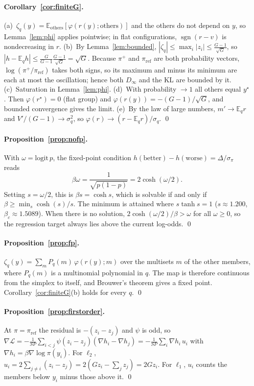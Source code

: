 \documentclass[11pt]{article}
\theoremstyle{definition}
\theoremstyle{remark}
\newcommand{\E}{\mathbb{E}}
\newcommand{\pref}{\pi_{\mathrm{ref}}}
\newcommand{\sgn}{\operatorname{sgn}}
\newcommand{\Dinf}{D_{\infty}}
\newcommand{\cL}{\mathcal{L}}
\newcommand{\1}{\mathbb{1}}
\begin{document}
\paragraph{Corollary~\ref{cor:finiteG}.} (a)~$\zeta_q(y)=\E_{\mathrm{others}}[\varphi(r(y);\mathrm{others})]$
and the others do not depend on $y$, so Lemma~\ref{lem:phi} applies pointwise; in
flat configurations, $\sgn(r-v)$ is nondecreasing in $r$. (b)~By
Lemma~\ref{lem:bounded}, $|\zeta_q|\le\max_i|z_i|\le\frac{G-1}{\sqrt G}$, so
$|h-\E_qh|\le\frac{G}{G-1}\frac{G-1}{\sqrt G}=\sqrt G$. Because
$\pi^+$ and $\pref$ are both probability vectors, $\log(\pi^+/\pref)$ takes both signs, so
its maximum and minus its minimum are each at most the oscillation; hence both
$\Dinf$ and the KL are bounded by it. (c)~Saturation in Lemma~\ref{lem:phi}.
(d)~With probability $\to1$ all others equal $y^\star$. Then $\varphi(r^\star)=0$ (flat group)
and $\varphi(r(y))=-(G-1)/\sqrt G$, and bounded convergence gives the limit.
(e)~By the law of large numbers, $m'\to\E_qr$ and $V'/(G-1)\to\sigma_q^2$, so
$\varphi(r)\to(r-\E_qr)/\sigma_q$. \qed

\paragraph{Proposition~\ref{prop:nofp}.} With $\omega=\mathrm{logit}\,p$, the fixed-point
condition $h(\text{better})-h(\text{worse})=\Delta/\sigma_\pi$ reads
\[
  \beta\omega=\frac{1}{\sqrt{p(1-p)}}=2\cosh(\omega/2).
\]
Setting $s=\omega/2$, this is $\beta s=\cosh s$, which is solvable if and only if
$\beta\ge\min_s\cosh(s)/s$. The minimum is attained where $s\tanh s=1$
($s\approx1.200$, $\beta_c\approx1.5089$). When there is no solution,
$2\cosh(\omega/2)/\beta>\omega$ for all $\omega\ge0$, so the regression target always lies
above the current log-odds. \qed

\paragraph{Proposition~\ref{prop:fp}.} $\zeta_q(y)=\sum_mP_q(m)\,\varphi(r(y);m)$ over the
multisets $m$ of the other members, where $P_q(m)$ is a multinomial polynomial in
$q$. The map is therefore continuous from the simplex to itself, and Brouwer's
theorem gives a fixed point. Corollary~\ref{cor:finiteG}(b) holds for every $q$. \qed

\paragraph{Proposition~\ref{prop:firstorder}.} At $\pi=\pref$ the residual is
$-(z_i-z_j)$ and $\psi$ is odd, so
$\nabla\cL=-\frac{1}{SP}\sum_{i<j}\psi(z_i-z_j)(\nabla h_i-\nabla h_j)=-\frac{1}{SP}\sum_i\nabla h_i\,u_i$
with $\nabla h_i=\beta\nabla\log\pi(y_i)$. For $\ell_2$,
$u_i=2\sum_{j\neq i}(z_i-z_j)=2(Gz_i-\sum_jz_j)=2Gz_i$. For $\ell_1$, $u_i$ counts the members
below $y_i$ minus those above it. \qed
\end{document}
